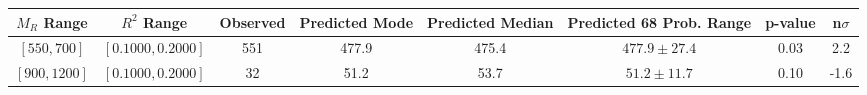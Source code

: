 \documentclass[12pt]{article}
\begin{document}
\begin{table}[!ht]
\begin{tiny}
\begin{center}
\begin{tabular}{|c|c|c|c|c|c|c|c|}
\hline
$M_R$ Range & $R^2$ Range & Observed & Predicted Mode & Predicted Median & Predicted 68 Prob. Range & p-value & n$\sigma$ \\
\hline
$[ 550, 700]$ & $[0.1000,0.2000]$ & 551 & 477.9 & 475.4 & $477.9 \pm 27.4$ & 0.03 &  2.2 \\ 
$[ 900,1200]$ & $[0.1000,0.2000]$ & 32 & 51.2 & 53.7 & $51.2 \pm 11.7$ & 0.10 & -1.6 \\ 
\hline
\end{tabular}
\end{center}
\end{tiny}
\end{table}
\end{document}

